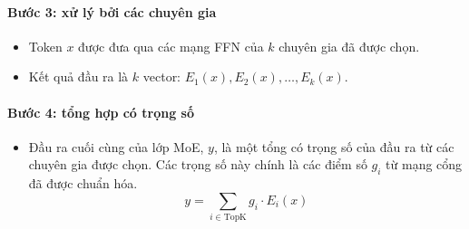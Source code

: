 \paragraph{Bước 3: xử lý bởi các chuyên gia}
\begin{itemize}
    \item Token $x$ được đưa qua các mạng FFN của $k$ chuyên gia đã được chọn.
    \item Kết quả đầu ra là $k$ vector: $E_1(x), E_2(x), \dots, E_k(x)$.
\end{itemize}

\paragraph{Bước 4: tổng hợp có trọng số}
\begin{itemize}
    \item Đầu ra cuối cùng của lớp MoE, $y$, là một tổng có trọng số của đầu ra từ các chuyên gia được chọn. Các trọng số này chính là các điểm số $g_i$ từ mạng cổng đã được chuẩn hóa.
    $$ y = \sum_{i \in \text{TopK}} g_i \cdot E_i(x) $$
\end{itemize}

